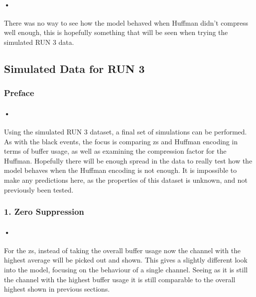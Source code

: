 \documentclass[a4paper, 12pt]{report}
\begin{document}
\paragraph{•}
There was no way to see how the model behaved when Huffman didn't compress well enough, this is hopefully something that will be seen when trying the simulated RUN 3 data.


\subsection{Simulated Data for RUN 3}

\subsubsection{Preface}
\paragraph{•}
Using the simulated RUN 3 dataset, a final set of simulations can be performed.
As with the black events, the focus is comparing \gls{zs} and Huffman encoding in terms of buffer usage, as well as examining the compression factor for the Huffman.
Hopefully there will be enough spread in the data to really test how the model behaves when the Huffman encoding is not enough.
It is impossible to make any predictions here, as the properties of this dataset is unknown, and not previously been tested.

\subsubsection{1. Zero Suppression}

\paragraph{•}
For the \gls{zs}, instead of taking the overall buffer usage now the channel with the highest average will be picked out and shown.
This gives a slightly different look into the model, focusing on the behaviour of a single channel.
Seeing as it is still the channel with the highest buffer usage it is still comparable to the overall highest shown in previous sections. 
\end{document}

